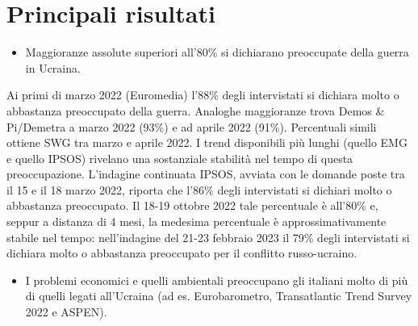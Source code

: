 \documentclass[
  openany]{book}
\providecommand{\tightlist}{%
  \setlength{\itemsep}{0pt}\setlength{\parskip}{0pt}}
\begin{document}
\hypertarget{principali-risultati}{%
\section{Principali risultati}\label{principali-risultati}}

\begin{itemize}
\tightlist
\item
  Maggioranze assolute superiori all'80\% si dichiarano preoccupate della guerra in Ucraina.
\end{itemize}

Ai primi di marzo 2022 (Euromedia) l'88\% degli intervistati si dichiara molto o abbastanza preoccupato della guerra. Analoghe maggioranze trova Demos \& Pi/Demetra a marzo 2022 (93\%) e ad aprile 2022 (91\%). Percentuali simili ottiene SWG tra marzo e aprile 2022. I trend disponibili più lunghi (quello EMG e quello IPSOS) rivelano una sostanziale stabilità nel tempo di questa preoccupazione. L'indagine continuata IPSOS, avviata con le domande poste tra il 15 e il 18 marzo 2022, riporta che l'86\% degli intervistati si dichiari molto o abbastanza preoccupato. Il 18-19 ottobre 2022 tale percentuale è all'80\% e, seppur a distanza di 4 mesi, la medesima percentuale è approssimativamente stabile nel tempo: nell'indagine del 21-23 febbraio 2023 il 79\% degli intervistati si dichiara molto o abbastanza preoccupato per il conflitto russo-ucraino.

\begin{itemize}
\tightlist
\item
  I problemi economici e quelli ambientali preoccupano gli italiani molto di più di quelli legati all'Ucraina (ad es. Eurobarometro, Transatlantic Trend Survey 2022 e ASPEN).
\end{itemize}
\end{document}
